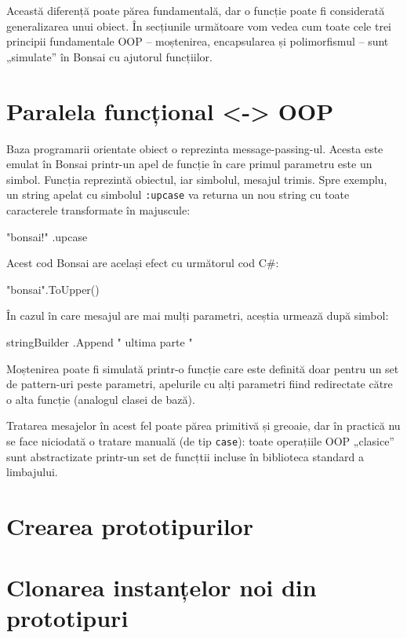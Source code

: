 \documentclass[12pt,a4paper]{memoir}
\begin{document}
Această diferență poate părea fundamentală, dar o funcție poate fi considerată generalizarea unui obiect. În secțiunile următoare vom vedea cum toate cele trei principii fundamentale OOP – moștenirea, encapsularea și polimorfismul – sunt „simulate” în Bonsai cu ajutorul funcțiilor.

\section{Paralela funcțional <-> OOP}

Baza programarii orientate obiect o reprezinta message-passing-ul. Acesta este emulat în Bonsai printr-un apel de funcție în care primul parametru este un simbol. Funcția reprezintă obiectul, iar simbolul, mesajul trimis. Spre exemplu, un string apelat cu simbolul \texttt{:upcase} va returna un nou string cu toate caracterele transformate în majuscule:
\begin{code}
"bonsai!" .upcase
\end{code}
Acest cod Bonsai are același efect cu următorul cod C\#:
\begin{code}
"bonsai".ToUpper()
\end{code}
În cazul în care mesajul are mai mulți parametri, aceștia urmează după simbol:
\begin{code}
stringBuilder .Append " ultima parte "
\end{code}

Moștenirea poate fi simulată printr-o funcție care este definită doar pentru un set de pattern-uri peste parametri, apelurile cu alți parametri fiind redirectate către o alta funcție (analogul clasei de bază).

Tratarea mesajelor în acest fel poate părea primitivă și greoaie, dar în practică nu se face niciodată o tratare manuală (de tip \texttt{case}): toate operațiile OOP „clasice” sunt abstractizate printr-un set de funcțtii incluse în biblioteca standard a limbajului.

\section{Crearea prototipurilor}


\section{Clonarea instanțelor noi din prototipuri}

\end{document}
